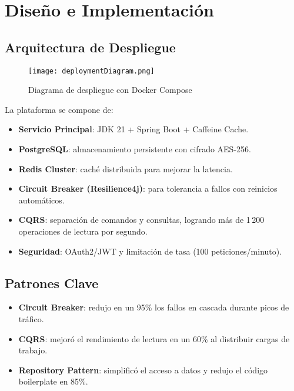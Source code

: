 \documentclass[10pt,journal]{IEEEtran}
\begin{document}
\section{Diseño e Implementación}
\subsection{Arquitectura de Despliegue}
\begin{figure}[htbp]
  \centering
  \texttt{[image: deploymentDiagram.png]}
  \caption{Diagrama de despliegue con Docker Compose}
  \label{fig:deployment}
\end{figure}
La plataforma se compone de:
\begin{itemize}
  \item \textbf{Servicio Principal}: JDK 21 + Spring Boot + Caffeine Cache.
  \item \textbf{PostgreSQL}: almacenamiento persistente con cifrado AES-256.
  \item \textbf{Redis Cluster}: caché distribuida para mejorar la latencia.
  \item \textbf{Circuit Breaker (Resilience4j)}: para tolerancia a fallos con reinicios automáticos.
  \item \textbf{CQRS}: separación de comandos y consultas, logrando más de 1\,200 operaciones de lectura por segundo.
  \item \textbf{Seguridad}: OAuth2/JWT y limitación de tasa (100 peticiones/minuto).
\end{itemize}

\subsection{Patrones Clave}
\begin{itemize}
  \item \textbf{Circuit Breaker}: redujo en un 95\% los fallos en cascada durante picos de tráfico.
  \item \textbf{CQRS}: mejoró el rendimiento de lectura en un 60\% al distribuir cargas de trabajo.
  \item \textbf{Repository Pattern}: simplificó el acceso a datos y redujo el código boilerplate en 85\%.
\end{itemize}
\end{document}
